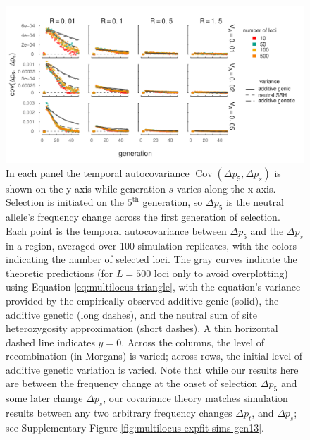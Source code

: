 \documentclass[11pt]{article}
\DeclareMathOperator{\cov}{Cov}
\begin{document}
\begin{figure}[!ht]
  \centering
  \includegraphics{./images/sim-pred-covs-varyl-alt.pdf}

  \caption{ In each panel the temporal autocovariance $\cov(\Delta p_5, \Delta
    p_s)$ is shown on the y-axis while generation $s$ varies along the x-axis.
    Selection is initiated on the $5^\text{th}$ generation, so $\Delta p_5$ is
    the neutral allele's frequency change across the first generation of
    selection. Each point is the temporal autocovariance between $\Delta p_5$
    and the $\Delta p_s$ in a region, averaged over 100 simulation replicates,
    with the colors indicating the number of selected loci. The gray curves
    indicate the theoretic predictions (for $L=500$ loci only to avoid
    overplotting) using Equation \eqref{eq:multilocus-triangle}, with the
    equation's variance provided by the empirically observed additive genic
    (solid), the additive genetic (long dashes), and the neutral sum of site
    heterozygosity approximation (short dashes). A thin horizontal dashed line
    indicates $y=0$.  Across the columns, the level of recombination (in
    Morgans) is varied; across rows, the initial level of additive genetic
    variation is varied.  Note that while our results here are between the
    frequency change at the onset of selection $\Delta p_5$ and some later
  change $\Delta p_s$, our covariance theory matches simulation results between
any two arbitrary frequency changes $\Delta p_t$, and $\Delta p_s$; see
Supplementary Figure \ref{fig:multilocus-expfit-sims-gen13}.}

  \label{fig:multilocus-expfit-sims}
\end{figure}
\end{document}
